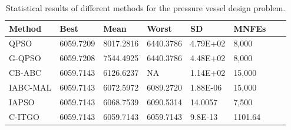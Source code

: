 
\begin{table*}[tp]
    \tiny
    \begin{center}
    
    \begin{tabular}{ P{2.0cm} P{2.0cm} P{2.0cm} P{2.0cm} P{2.0cm} P{2.0cm} P{2.0cm} P{2.0cm}  }
    \hline
    \textbf{Method} & \textbf{Best} & \textbf{Mean} & \textbf{Worst} & \textbf{SD} & \textbf{MNFEs} \\
    \hline
    
    QPSO & 6059.7209 & 8017.2816 & 6440.3786 & 4.79E+02 & 8,000 \\
    G-QPSO & 6059.7208 & 7544.4925 & 6440.3786 & 4.48E+02 & 8,000 \\
    CB-ABC & 6059.7143 & 6126.6237 & NA & 1.14E+02 & 15,000 \\
    IABC-MAL & 6059.7143 & 6072.5972 & 6089.2720 & 1.88E-06 & 15,000 \\
    IAPSO & 6059.7143 & 6068.7539 & 6090.5314 & 14.0057 & 7,500 \\
    C-ITGO & 6059.7143 & 6059.7143 & 6059.7143 & 9.8E-13 & 1101.64 \\
    
    \hline
    \end{tabular}
    \end{center}
    
    \caption{ Statistical results of different methods for the pressure vessel design problem. \\[1em]}
    \label{tab:PV}
    \end{table*}
    
    